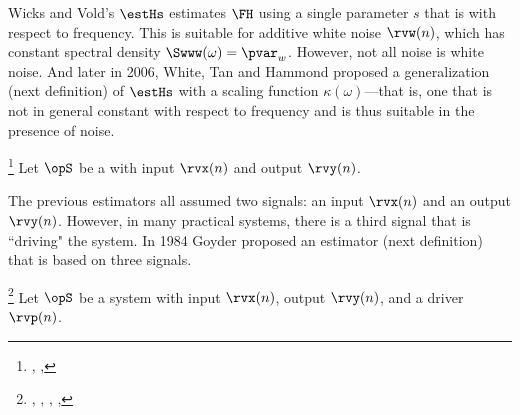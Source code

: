 Wicks and Vold's $\estHs$ estimates $\FH$ using a single parameter $s$
that is  with respect to frequency.
This is suitable for additive white noise $\rvw(n)$, which has constant spectral density 
$\Swww(\omega)=\pvar_w$.
However, not all noise is white noise.
And later in 2006, White, Tan and Hammond proposed a generalization (next definition) of $\estHs$ with a scaling 
function $\kappa(\omega)$---that is, one that is not in general constant with respect to frequency
and is thus suitable in the presence of  noise.
\begin{definition}
\footnote{
  ,
  ,
  }
\label{def:Hkappa}
Let $\opS$ be a  with input $\rvx(n)$ and output $\rvy(n)$.
\end{definition}

The previous estimators all assumed two signals: an input $\rvx(n)$ and an output $\rvy(n)$.
However, in many practical systems, there is a third signal that is ``driving" the system.
In 1984 Goyder proposed an estimator (next definition) that is based on three signals.
\begin{definition}
\footnote{
  ,
  ,
  ,
  ,
  }
\label{def:Hc}
Let $\opS$ be a system with input $\rvx(n)$, output $\rvy(n)$, and a driver $\rvp(n)$.
\end{definition}

